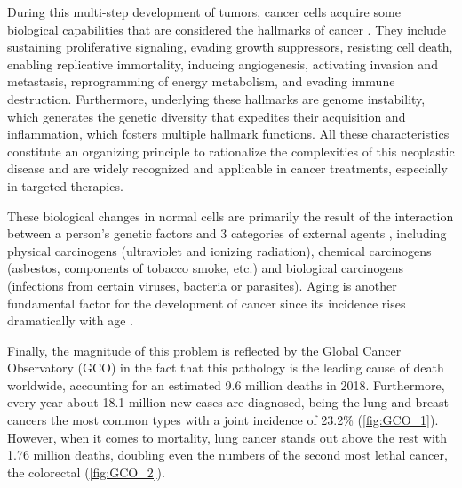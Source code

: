 During this multi-step development of tumors, cancer cells acquire some biological capabilities that are considered the hallmarks of cancer \cite{Hallmarks}. They include sustaining proliferative signaling, evading growth suppressors, resisting cell death, enabling replicative immortality, inducing angiogenesis, activating invasion and metastasis, reprogramming of energy metabolism, and evading immune destruction. Furthermore, underlying these hallmarks are genome instability, which generates the genetic diversity that expedites their acquisition and inflammation, which fosters multiple hallmark functions. All these characteristics constitute an organizing principle to rationalize the complexities of this neoplastic disease and are widely recognized and applicable in cancer treatments, especially in targeted therapies.

These biological changes in normal cells are primarily the result of the interaction between a person's genetic factors and 3 categories of external agents \cite{WCR}, including physical carcinogens (ultraviolet and ionizing radiation), chemical carcinogens (asbestos, components of tobacco smoke, etc.) and biological carcinogens (infections from certain viruses, bacteria or parasites). Aging is another fundamental factor for the development of cancer since its incidence rises dramatically with age \cite{Globocan}.

Finally, the magnitude of this problem is reflected by the Global Cancer Observatory (GCO) \cite{Globocan} in the fact that this pathology is the leading cause of death worldwide, accounting for an estimated 9.6 million deaths in 2018. Furthermore, every year about 18.1 million new cases are diagnosed, being the lung and breast cancers the most common types with a joint incidence of 23.2\% (\autoref{fig:GCO_1}). However, when it comes to mortality, lung cancer stands out above the rest with 1.76 million deaths, doubling even the numbers of the second most lethal cancer, the colorectal (\autoref{fig:GCO_2}).

